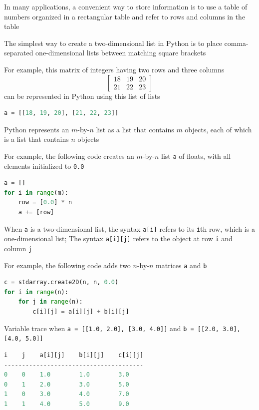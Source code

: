 \documentclass[8pt,a4paper,compress]{beamer}
\begin{document}
\begin{frame}[fragile]
\pause

In many applications, a convenient way to store information is to use a table of numbers organized in a rectangular table and refer to rows and columns in the table

\pause
\bigskip

The simplest way to create a two-dimensional list in Python is to place comma-separated one-dimensional lists between matching square brackets 

\pause
\bigskip

For example, this matrix of integers having two rows and three columns 
\[
\begin{bmatrix}
18 & 19 & 20 \\ 
21 & 22 & 23
\end{bmatrix}
\]
can be represented in Python using this list of lists
\begin{lstlisting}[language=Python]
a = [[18, 19, 20], [21, 22, 23]]
\end{lstlisting}

\pause
\bigskip

Python represents an $m$-by-$n$ list as a list that contains $m$ objects, each of which is a list that contains $n$ objects

\pause
\bigskip

For example, the following code creates an $m$-by-$n$ list \lstinline{a} of floats, with all elements initialized to \lstinline{0.0}
\begin{lstlisting}[language=Python]
a = []
for i in range(m):
    row = [0.0] * n
    a += [row]
\end{lstlisting}
\end{frame}

\begin{frame}[fragile]
\pause

When \lstinline{a} is a two-dimensional list, the syntax \lstinline{a[i]} refers to its \lstinline{i}th row, which is a one-dimensional list; The syntax \lstinline{a[i][j]} refers to the object at row \lstinline{i} and column \lstinline{j}

\pause
\bigskip

For example, the following code adds two $n$-by-$n$ matrices \lstinline{a} and \lstinline{b}

\begin{lstlisting}[language=Python]
c = stdarray.create2D(n, n, 0.0)
for i in range(n):
    for j in range(n):
        c[i][j] = a[i][j] + b[i][j]
\end{lstlisting}

\pause

Variable trace when \lstinline{a = [[1.0, 2.0], [3.0, 4.0]]} and \lstinline{b = [[2.0, 3.0], [4.0, 5.0]]}
\begin{lstlisting}[language=Python]
i    j    a[i][j]    b[i][j]    c[i][j]
---------------------------------------
0    0    1.0        1.0        3.0
0    1    2.0        3.0        5.0
1    0    3.0        4.0        7.0
1    1    4.0        5.0        9.0
\end{lstlisting}
\end{frame}
\end{document}
